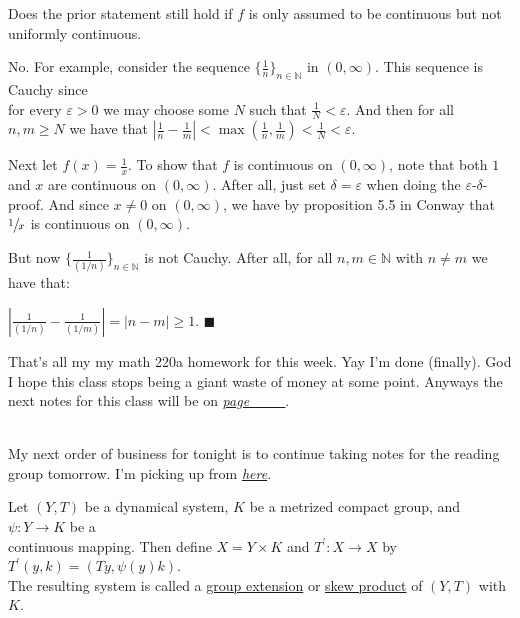 \documentclass{book}
\newcommand{\inLinkRap}[2]{{\color{blue}\hyperlink{#1}{\textit{#2}}}}
\newcommand{\hTwo}{%
\color{Black}%
   \fontsize{13}{15}\selectfont%
}
\newcommand{\HexOne}{%
   \color{Purple}%
   \fontsize{12}{13}\selectfont%
}
\newenvironment{myIndent}{%
   \begin{adjustwidth}{2.5em}{0em}%
}{%
   \end{adjustwidth}%
}
\newcommand{\udefine}[1]{{%
   \setulcolor{Red}%
   \setul{0.14em}{0.07em}%
   \ul{#1}%
}}
\newcommand{\mySepTwo}[1][.]{%
   {\noindent\color{#1}{\rule{6.5in}{0.5mm}}}\\%
}
\newcommand{\retTwo}{\hfill\bigbreak}
\begin{document}
Does the prior statement still hold if $f$ is only assumed to be continuous but not\\ uniformly continuous.
\begin{myIndent}\HexOne
	No. For example, consider the sequence $\{\frac{1}{n}\}_{n \in \mathbb{N}}$ in $(0, \infty)$. This sequence is Cauchy since\\ for every $\varepsilon > 0$ we may choose some $N$ such that $\frac{1}{N} < \varepsilon$. And then for all $n, m \geq N$ we have that $|\frac{1}{n} - \frac{1}{m}| < \max(\frac{1}{n}, \frac{1}{m}) < \frac{1}{N} < \varepsilon$.\newpage

	Next let $f(x) = \frac{1}{x}$. To show that $f$ is continuous on $(0, \infty)$, note that both $1$ and $x$ are continuous on $(0, \infty)$. After all, just set $\delta = \varepsilon$ when doing the $\varepsilon$-$\delta$-proof. And since $x \neq 0$ on $(0, \infty)$, we have by proposition 5.5 in Conway that $\sfrac{1}{x}$ is continuous on $(0, \infty)$.\retTwo

	But now $\{\frac{1}{(1/n)}\}_{n \in \mathbb{N}}$ is not Cauchy. After all, for all $n,m \in \mathbb{N}$ with $n \neq m$ we have that:
	
	{\centering$|\frac{1}{(1/n)} - \frac{1}{(1/m)}| = |n - m| \geq 1$. $\blacksquare$\retTwo\par}
\end{myIndent}

\hTwo That's all my my math 220a homework for this week. Yay I'm done (finally). God I hope this class stops being a giant waste of money at some point. Anyways the next notes for this class will be on \inLinkRap{math 220a lecture 6}{page \_\_\_}.\retTwo

\mySepTwo

\hypertarget{Ergodic reading group notes 2}{My} next order of business for tonight is to continue taking notes for the reading group tomorrow. I'm picking up from \inLinkRap{Ergodic reading group notes 1 back}{here}.\retTwo

Let $(Y, T)$ be a dynamical system, $K$ be  a metrized compact group, and $\psi: Y \to K$ be a\\ continuous mapping. Then define $X = Y \times K$ and $T^\prime: X \to X$ by $T^\prime(y, k) = (Ty, \psi(y)k)$.\\ The resulting system is called a \udefine{group extension} or \udefine{skew product}  of $(Y, T)$ with $K$.
\end{document}
